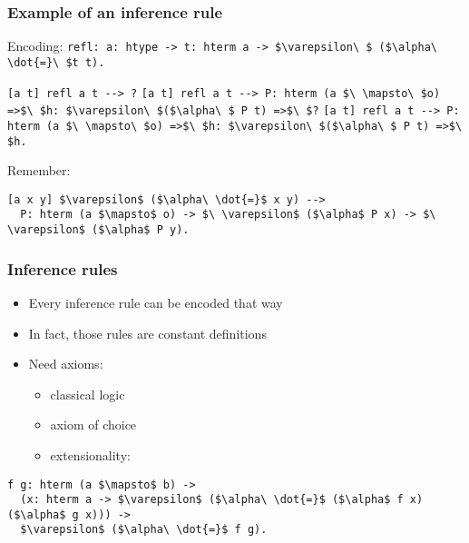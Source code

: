 \begin{frame}[fragile]
\frametitle{Example of an inference rule}

\begin{mathpar}
\end{mathpar}

\begin{block}{Encoding:}
\lstinline!refl: a: htype -> t: hterm a -> $\varepsilon\ $ ($\alpha\ \dot{=}\ $t t).!

\begin{overprint}
\lstinline![a t] refl a t --> ?!
\lstinline![a t] refl a t --> P: hterm (a $\ \mapsto\ $o) =>$\ $h: $\varepsilon\ $($\alpha\ $ P t) =>$\ $?!
\lstinline![a t] refl a t --> P: hterm (a $\ \mapsto\ $o) =>$\ $h: $\varepsilon\ $($\alpha\ $ P t) =>$\ $h.!
\end{overprint}
\end{block}

\begin{block}{Remember:}
\begin{lstlisting}
[a x y] $\varepsilon$ ($\alpha\ \dot{=}$ x y) -->
  P: hterm (a $\mapsto$ o) -> $\ \varepsilon$ ($\alpha$ P x) -> $\ \varepsilon$ ($\alpha$ P y).
\end{lstlisting}
\end{block}

\end{frame}


\begin{frame}[fragile]
\frametitle{Inference rules}

\begin{itemize}
\item Every inference rule can be encoded that way
\item In fact, those rules are \alert{constant definitions}
\item Need axioms:
  \begin{itemize}
  \item classical logic
  \item axiom of choice
  \item extensionality:
  \end{itemize}
\end{itemize}

\begin{lstlisting}
f g: hterm (a $\mapsto$ b) ->
  (x: hterm a -> $\varepsilon$ ($\alpha\ \dot{=}$ ($\alpha$ f x) ($\alpha$ g x))) ->
  $\varepsilon$ ($\alpha\ \dot{=}$ f g).
\end{lstlisting}

\end{frame}


